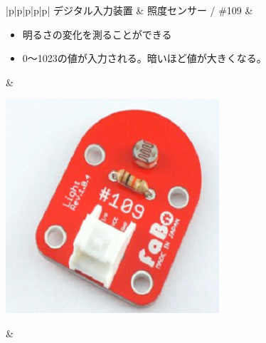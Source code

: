 \begin{table}[H]
\begin{widerrows}
\begin{tabular}{|p{\colA}|p{\colB}|p{\colC}|p{\colD}|p{\colE}|}
			デジタル入力装置 & 照度センサー / \#109 & 
			\begin{minipage}[t]{\linewidth}
				\begin{itemize}
					\item 明るさの変化を測ることができる
					\item 0〜1023の値が入力される。暗いほど値が大きくなる。
				\end{itemize}
				\smallskip
			\end{minipage} & 
			\begin{minipage}[t]{\linewidth}
				\smallskip
				\centering
				\includegraphics[width=0.8\linewidth]{images/chap05/text05-img024.png}
				\smallskip
			\end{minipage} &
			\pageref{light}\\ \hline


\end{tabular}
\end{widerrows}
\end{table}
